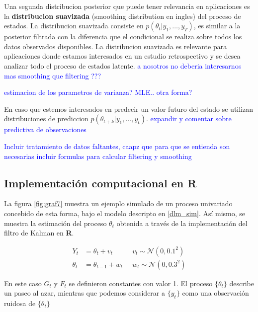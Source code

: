 \documentclass[12pt]{article}\usepackage[]{graphicx}\usepackage[]{color}
\begin{document}
Una segunda distribucion posterior que puede tener relevancia en aplicaciones es la \textbf{distribucion suavizada} (smoothing distribution en ingles) del proceso de estados. La distribucion suavizada consiste en $p(\theta_t | y_1, \ldots, y_T)$, es similar a la posterior filtrada con la diferencia que el condicional se realiza sobre todos los datos observados disponibles. La distribucion suavizada es relevante para aplicaciones donde estamos interesados en un estudio retrospectivo y se desea analizar todo el proceso de estados latente. \textcolor{blue}{a nosotros no deberia interesarnos mas smoothing que filtering ???}

\textcolor{blue}{estimacion de los parametros de varianza? MLE.. otra forma?}

En caso que estemos interesados en predecir un valor futuro del estado se utilizan distribuciones de prediccion $p(\theta_{t+k} | y_1, \ldots, y_t)$. \textcolor{blue}{expandir y comentar sobre predictiva de observaciones}

\textcolor{blue}{Incluir tratamiento de datos faltantes, caapz que para que se entienda son necesarias incluir formulas para calcular filtering y smoothing}


\subsection{Implementación computacional en \textbf{R}}\label{implementacionR}

La figura \ref{fig:graf7} muestra un ejemplo simulado de un proceso univariado concebido de esta forma, bajo el modelo descripto en \eqref{dlm_sim}. Así mismo, se muestra la estimación del proceso $\theta_t$ obtenida a través de la implementación del filtro de Kalman en \textbf{R}.

\begin{equation}
\begin{aligned}
Y_t&=\theta_t + v_t  \;&\;  v_t \sim \mathcal{N}(0,0.1^2) \\
\theta_t &= \theta_{t-1} + w_t \;&\; w_t \sim \mathcal{N}(0,0.3^2)
\end{aligned}
\label{dlm_sim}
\end{equation}

En este caso $G_t$ y $F_t$ se definieron constantes con valor 1. El proceso $\{\theta_t\}$ describe un paseo al azar, mientras que podemos considerar a $\{y_t\}$ como una observación ruidosa de $\{\theta_t\}$

\newcommand{\thetaline}{\raisebox{2pt}{\tikz{\draw[-,theta,-,line width = 0.9pt](0,0) -- (5mm,0); }}\;}
\newcommand{\yeline}{\raisebox{2pt}{\tikz{\draw[-,ye,-,line width = 0.9pt](0,0) -- (5mm,0); }}\;}
\end{document}
